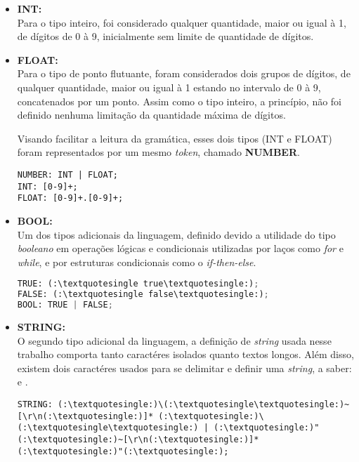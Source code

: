             \begin{itemize}
                \item \textbf{INT:}\\
                    Para o tipo inteiro, foi considerado qualquer quantidade, maior ou igual à 1, de dígitos de 0 à 9, inicialmente sem limite de quantidade de dígitos.

                \item \textbf{FLOAT:}\\
                    Para o tipo de ponto flutuante, foram considerados dois grupos de dígitos, de qualquer quantidade, maior ou igual à 1 estando no intervalo de 0 à 9, concatenados por um ponto. Assim como o tipo inteiro, a princípio, não foi definido nenhuma limitação da quantidade máxima de dígitos.

                    Visando facilitar a leitura da gramática, esses dois tipos (INT e FLOAT) foram representados por um mesmo \textit{token}, chamado \textbf{NUMBER}.

                    \begin{lstlisting}
NUMBER: INT | FLOAT;
INT: [0-9]+;
FLOAT: [0-9]+.[0-9]+;
                    \end{lstlisting}

                \item \textbf{BOOL:}\\
                    Um dos tipos adicionais da linguagem, definido devido a utilidade do tipo \textit{booleano} em operações lógicas e condicionais utilizadas por laços como \textit{for} e \textit{while}, e por estruturas condicionais como o \textit{if-then-else}.

                    \begin{lstlisting}[language=python]
TRUE: (:\textquotesingle true\textquotesingle:);
FALSE: (:\textquotesingle false\textquotesingle:);
BOOL: TRUE | FALSE;
                    \end{lstlisting}

                \item \textbf{STRING:}\\
                    O segundo tipo adicional da linguagem, a definição de \textit{string} usada nesse trabalho comporta tanto caractéres isolados quanto textos longos. Além disso, existem dois caractéres usados para se delimitar e definir uma \textit{string}, a saber: \textquotesingle \vspace{0.1cm} e \textquotedbl.

                    \begin{lstlisting}
STRING: (:\textquotesingle:)\(:\textquotesingle\textquotesingle:)~[\r\n(:\textquotesingle:)]* (:\textquotesingle:)\(:\textquotesingle\textquotesingle:) | (:\textquotesingle:)"(:\textquotesingle:)~[\r\n(:\textquotesingle:)]*(:\textquotesingle:)"(:\textquotesingle:);
                    \end{lstlisting}
            \end{itemize}


